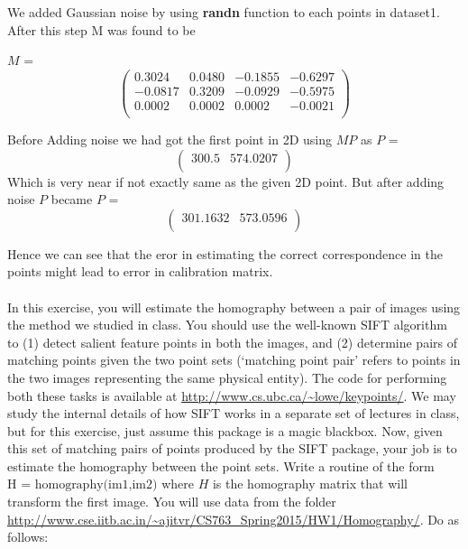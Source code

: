 \documentclass[a4paper,10pt]{article}
\begin{document}
We added Gaussian noise by using \textbf{randn} function to each points in dataset1. After this step M was found to be

$M$ = \[ \left( \begin{array}{cccc}
    0.3024  & 0.0480 & -0.1855 & -0.6297\\
   -0.0817  & 0.3209 & -0.0929 & -0.5975\\
    0.0002  & 0.0002 &  0.0002 & -0.0021\\
              \end{array} \right)\]
              
Before Adding noise we had got the first point in 2D using $MP$ as 
$P$ = \[ \left( \begin{array}{cc}
               300.5 & 574.0207\\
              \end{array} \right)\]
Which is very near if not exactly same as the given 2D point. But after adding noise $P$ became
$P$ = \[ \left( \begin{array}{cc}
               301.1632 & 573.0596\\
              \end{array} \right)\]

              
Hence we can see that the eror in estimating the correct correspondence in the points might lead to error in 
calibration matrix.\\
\\
In this exercise, you will estimate the homography between a pair of images using the method we studied in class. 
You should use the well-known SIFT algorithm to (1) detect salient feature points in both the images, 
and (2) determine pairs of matching points given the two point sets (`matching point pair' refers to points in 
the two images representing the same physical entity). The code for performing both these tasks is available at 
\url{http://www.cs.ubc.ca/~lowe/keypoints/}. We may study the internal details of how SIFT works in a separate set
of lectures in class, but for this exercise, just assume this package is a magic blackbox. Now, given this set of
matching pairs of points produced by the SIFT package, your job is to estimate the homography between the point 
sets. Write a routine of the form $\textrm{H = homography(im1,im2)}$ where $H$ is the homography matrix that will
transform the first image. You will use data from the folder \url{http://www.cse.iitb.ac.in/~ajitvr/CS763_Spring2015/HW1/Homography/}. Do as follows:
\end{document}
